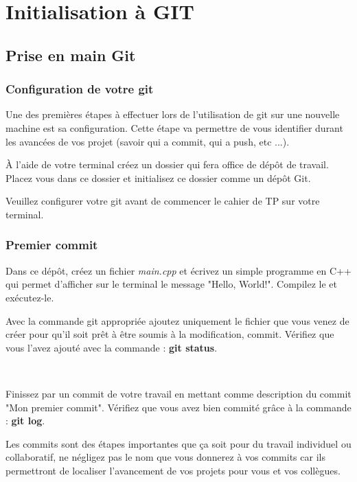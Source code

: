 \setcounter{page}{1}
\chapter*{Initialisation à GIT}
\section{Prise en main Git}
\subsection{Configuration de votre git}

Une des premières étapes à effectuer lors de l'utilisation de git sur une nouvelle machine est sa configuration. Cette étape va permettre de vous identifier durant les avancées de vos projet (savoir qui a commit, qui a push, etc ...). 

\medskip

À l'aide de votre terminal créez un dossier qui fera office de dépôt de travail. Placez vous dans ce dossier et initialisez ce dossier comme un dépôt Git.

\medskip

Veuillez configurer votre git avant de commencer le cahier de TP sur votre terminal.


\subsection{Premier commit}

Dans ce dépôt, créez un fichier \textit{main.cpp} et écrivez un simple programme en C++ qui permet d'afficher sur le terminal le message "Hello, World!". Compilez le et exécutez-le. 

\medskip

Avec la commande git appropriée ajoutez uniquement le fichier que vous venez de créer pour qu'il soit prêt à être soumis à la modification, commit. Vérifiez que vous l'avez ajouté avec la commande : \textbf{git status}.

~

Finissez par un commit de votre travail en mettant comme description du commit "Mon premier commit". Vérifiez que vous avez bien commité grâce à la commande : \textbf{git log}. 

\medskip

Les commits sont des étapes importantes que ça soit pour du travail individuel ou collaboratif, ne négligez pas le nom que vous donnerez à vos commits car ils permettront de localiser l'avancement de vos projets pour vous et vos collègues.

